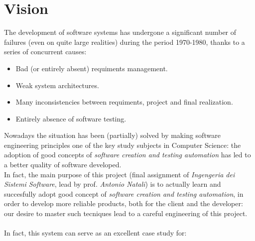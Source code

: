 \documentclass{llncs}
\newcommand{\labelsec}[1]{\label{sec:#1}}
\begin{document}
\newpage
\section{Vision}
\labelsec{Vision}
The development of software systems has undergone a significant number of failures (even on quite large realities) during the period 1970-1980, thanks to a series of concurrent causes:
\begin{itemize}
\item Bad (or entirely absent) requiments management.
\item Weak system architectures.
\item Many inconsistencies between requiments, project and final realization.
\item Entirely absence of software testing.
\end{itemize}
Nowadays the situation has been (partially) solved by making software engineering principles one of the key study subjects in Computer Science: the adoption of good concepts of \textit{software creation and testing automation} has led to a better quality of software developed.\\ 
In fact, the main purpose of this project (final assignment of \textit{Ingengeria dei Sistemi Software}, lead by prof. \textit{Antonio Natali}) is to actually learn and succesfully adopt good concept of \textit{software creation and testing automation}, in order to develop more reliable products, both for the client and the developer: our desire to master such tecniques lead to a careful engineering of this project.\\\\
In fact, this system can serve as an excellent case study for:
\end{document}
